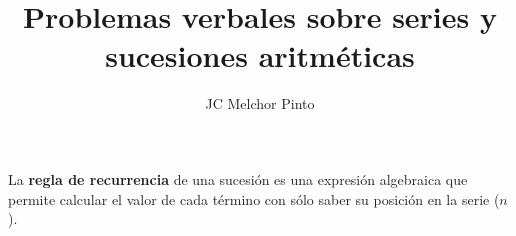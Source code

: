 \documentclass[12pt,addpoints]{guia}
\title{Problemas verbales sobre series y sucesiones aritméticas}
\author{JC Melchor Pinto}
\begin{document}
\INFO%

\begin{multicols}{2}
    
    
    \columnbreak
    
    
\end{multicols}%
\begin{importantbox}
    La \textbf{regla de recurrencia} de una sucesión es una expresión algebraica que permite calcular el valor de cada término con sólo saber su posición en la serie ($n$).
\end{importantbox}
\ejemplosboxed[]
\begin{questions}
    \questionboxed[15]{}
    \questionboxed[20]{}
    \questionboxed[20]{}
    \ejemplosboxed[]
    \questionboxed[10]{}
    \ejemplosboxed[]
    \questionboxed[15]{}
    \ejemplosboxed[]
    \questionboxed[20]{}
\end{questions}
\end{document}
